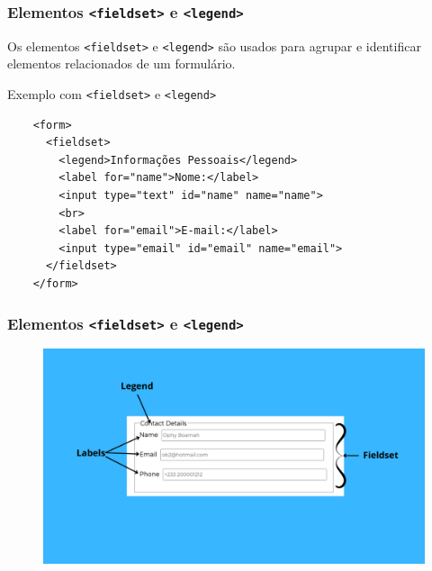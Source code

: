 \documentclass{beamer}
\begin{document}
\begin{frame}[fragile]
  \frametitle{Elementos \texttt{<fieldset>} e \texttt{<legend>}}

  Os elementos \texttt{<fieldset>} e \texttt{<legend>} são usados para agrupar e identificar elementos relacionados de um formulário.

  \begin{block}{Exemplo com \texttt{<fieldset>} e \texttt{<legend>}}
    \begin{verbatim}
    <form>
      <fieldset>
        <legend>Informações Pessoais</legend>
        <label for="name">Nome:</label>
        <input type="text" id="name" name="name">
        <br>
        <label for="email">E-mail:</label>
        <input type="email" id="email" name="email">
      </fieldset>
    </form>
    \end{verbatim}
  \end{block}
\end{frame}


\begin{frame}
\frametitle{Elementos \texttt{<fieldset>} e \texttt{<legend>}}
\begin{figure}
    \centering
    \includegraphics[width=\linewidth]{img/Fieldset-2.png}

\end{figure}

\end{frame}
\end{document}
